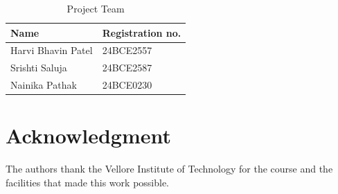 \documentclass[conference]{IEEEtran}
\begin{document}
\begin{table}[!h]
\caption{Project Team}
\label{tab:team}
\centering
\footnotesize
\begin{tabular}{@{}l l@{}}
\toprule
Name & Registration no. \\
\midrule
Harvi Bhavin Patel & 24BCE2557 \\
Srishti Saluja & 24BCE2587 \\
Nainika Pathak & 24BCE0230 \\
\bottomrule
\end{tabular}
\end{table}

\section*{Acknowledgment}
The authors thank the Vellore Institute of Technology for the course and the facilities that made this work possible.
\end{document}
